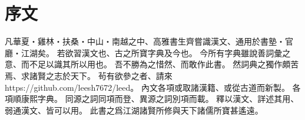 \chapter*{序文}
凡華夏・雞林・扶桑・中山・南越之中、高雅書生齊嘗識漢文、通用於書塾・官廳・江湖矣。
若欲習漢文也、古之所寶字典及今也。
今所有字典雖說善詞彙之意、而不足以識其所以用也。
吾不勝為之惜然、而敢作此書。
然詞典之獨作頗苦焉、求諸賢之志於天下。
茍有欲參之者、請來 https://github.com/leesh7672/leed。
內文各項或取諸漢籍、或從古道而新製。
各項順康熙字典。
同源之詞同項而登、異源之詞別項而載。
釋以漢文、詳述其用、弱通漢文、皆可以用。
此書之爲江湖諸賢所修與天下諸儒所寶甚遙遠。
